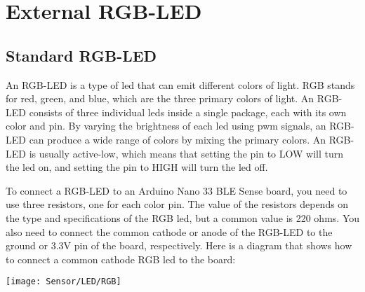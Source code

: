 %
%
%




\chapter{External RGB-LED}


\section{Standard RGB-LED}

An RGB-LED is a type of \ac{led} that can emit different colors of light. RGB stands for red, green, and blue, which are the three primary colors of light. An RGB-LED consists of three individual \ac{led}s inside a single package, each with its own color and pin. By varying the brightness of each \ac{led} using \ac{pwm} signals, an RGB-LED can produce a wide range of colors by mixing the primary colors. An RGB-LED is usually active-low, which means that setting the pin to LOW will turn the \ac{led} on, and setting the pin to HIGH will turn the \ac{led} off. 


To connect a RGB-LED to an Arduino Nano 33 BLE Sense board, you need to use three resistors, one for each color pin. The value of the resistors depends on the type and specifications of the RGB \ac{led}, but a common value is 220 ohms. You also need to connect the common cathode or anode of the RGB-LED to the ground or 3.3V pin of the board, respectively. Here is a diagram that shows how to connect a common cathode RGB \ac{led} to the board:






\begin{center}
    \texttt{[image: Sensor/LED/RGB]}
\end{center}


